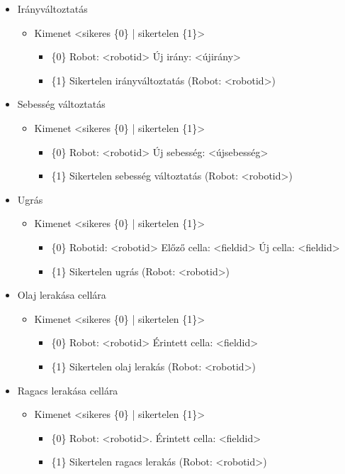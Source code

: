 \begin{itemize}
	\item Irányváltoztatás
	\begin{itemize}
		\item Kimenet <sikeres \{0\} | sikertelen \{1\}>
		\begin{itemize}
				\item \{0\} Robot: <robotid> Új irány: <újirány>
				\item \{1\} Sikertelen irányváltoztatás (Robot: <robotid>)
		\end{itemize}
	\end{itemize}
	
	\item Sebesség változtatás
	\begin{itemize}
		\item Kimenet <sikeres \{0\} | sikertelen \{1\}>
		\begin{itemize}
			\item \{0\} Robot: <robotid> Új sebesség: <újsebesség>
			\item \{1\} Sikertelen sebesség változtatás (Robot: <robotid>)
		\end{itemize}
	\end{itemize}
	
	\item Ugrás
	\begin{itemize}
		\item Kimenet <sikeres \{0\} | sikertelen \{1\}>
		\begin{itemize}
			\item \{0\} Robotid: <robotid> Előző cella: <fieldid> Új cella: <fieldid>
			\item \{1\} Sikertelen ugrás (Robot: <robotid>)
		\end{itemize}
	\end{itemize}
	
	\item Olaj lerakása cellára
	\begin{itemize}
		\item Kimenet <sikeres \{0\} | sikertelen \{1\}>
		\begin{itemize}
			\item \{0\} Robot: <robotid>  Érintett cella: <fieldid>
			\item \{1\} Sikertelen olaj lerakás (Robot: <robotid>)
		\end{itemize}
	\end{itemize}
	
	\item Ragacs lerakása cellára
	\begin{itemize}
		\item Kimenet <sikeres \{0\} | sikertelen \{1\}>
		\begin{itemize}
			\item \{0\} Robot: <robotid>. Érintett cella: <fieldid>
			\item \{1\} Sikertelen ragacs lerakás (Robot: <robotid>)
		\end{itemize}
	\end{itemize}	
	

\end{itemize}
